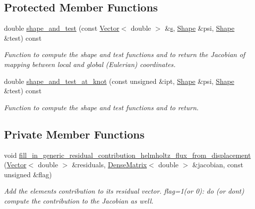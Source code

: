 \subsection*{Protected Member Functions}
\begin{DoxyCompactItemize}
\item 
double \hyperlink{classoomph_1_1PMLHelmholtzFluxFromNormalDisplacementBCElement_a4e6b686d2905fc642cb735d611830be4}{shape\+\_\+and\+\_\+test} (const \hyperlink{classoomph_1_1Vector}{Vector}$<$ double $>$ \&\hyperlink{cfortran_8h_ab7123126e4885ef647dd9c6e3807a21c}{s}, \hyperlink{classoomph_1_1Shape}{Shape} \&psi, \hyperlink{classoomph_1_1Shape}{Shape} \&test) const
\begin{DoxyCompactList}\small\item\em Function to compute the shape and test functions and to return the Jacobian of mapping between local and global (Eulerian) coordinates. \end{DoxyCompactList}\item 
double \hyperlink{classoomph_1_1PMLHelmholtzFluxFromNormalDisplacementBCElement_ac0c13560b5e8dba19dc11f44f455bf97}{shape\+\_\+and\+\_\+test\+\_\+at\+\_\+knot} (const unsigned \&ipt, \hyperlink{classoomph_1_1Shape}{Shape} \&psi, \hyperlink{classoomph_1_1Shape}{Shape} \&test) const
\begin{DoxyCompactList}\small\item\em Function to compute the shape and test functions and to return. \end{DoxyCompactList}\end{DoxyCompactItemize}
\subsection*{Private Member Functions}
\begin{DoxyCompactItemize}
\item 
void \hyperlink{classoomph_1_1PMLHelmholtzFluxFromNormalDisplacementBCElement_a1efff41871abb12efe479ee7434b93b5}{fill\+\_\+in\+\_\+generic\+\_\+residual\+\_\+contribution\+\_\+helmholtz\+\_\+flux\+\_\+from\+\_\+displacement} (\hyperlink{classoomph_1_1Vector}{Vector}$<$ double $>$ \&residuals, \hyperlink{classoomph_1_1DenseMatrix}{Dense\+Matrix}$<$ double $>$ \&jacobian, const unsigned \&flag)
\begin{DoxyCompactList}\small\item\em Add the element\textquotesingle{}s contribution to its residual vector. flag=1(or 0)\+: do (or don\textquotesingle{}t) compute the contribution to the Jacobian as well. \end{DoxyCompactList}\end{DoxyCompactItemize}
